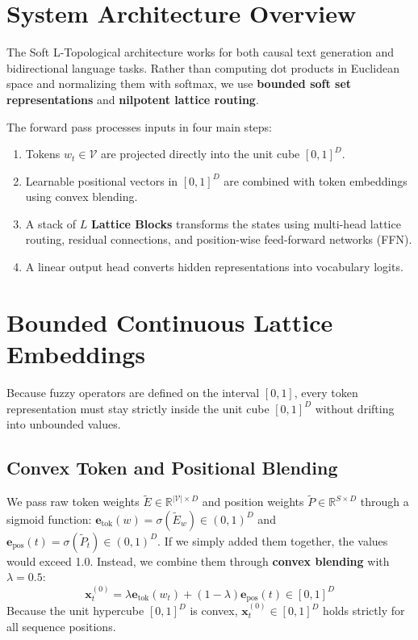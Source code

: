 \label{chap:methodology}

\section{System Architecture Overview}
The Soft L-Topological architecture works for both causal text generation and bidirectional language tasks. Rather than computing dot products in Euclidean space and normalizing them with softmax, we use \textbf{bounded soft set representations} and \textbf{nilpotent lattice routing}.

The forward pass processes inputs in four main steps:
\begin{enumerate}[itemsep=1.5pt, topsep=2pt, parsep=0pt]
    \item Tokens $w_t \in \mathcal{V}$ are projected directly into the unit cube $[0, 1]^D$.
    \item Learnable positional vectors in $[0, 1]^D$ are combined with token embeddings using convex blending.
    \item A stack of $L$ \textbf{Lattice Blocks} transforms the states using multi-head lattice routing, residual connections, and position-wise feed-forward networks (FFN).
    \item A linear output head converts hidden representations into vocabulary logits.
\end{enumerate}

\section{Bounded Continuous Lattice Embeddings}
Because fuzzy operators are defined on the interval $[0, 1]$, every token representation must stay strictly inside the unit cube $[0, 1]^D$ without drifting into unbounded values.

\subsection{Convex Token and Positional Blending}
We pass raw token weights $\widetilde{E} \in \mathbb{R}^{|\mathcal{V}| \times D}$ and position weights $\widetilde{P} \in \mathbb{R}^{S \times D}$ through a sigmoid function: $\mathbf{e}_{\text{tok}}(w) = \sigma(\widetilde{E}_w) \in (0, 1)^D$ and $\mathbf{e}_{\text{pos}}(t) = \sigma(\widetilde{P}_t) \in (0, 1)^D$. If we simply added them together, the values would exceed 1.0. Instead, we combine them through \textbf{convex blending} with $\lambda = 0.5$:
\begin{equation}
\label{eq:convex_blending}
\mathbf{x}_t^{(0)} = \lambda \mathbf{e}_{\text{tok}}(w_t) + (1 - \lambda) \mathbf{e}_{\text{pos}}(t) \in [0, 1]^D
\end{equation}
Because the unit hypercube $[0, 1]^D$ is convex, $\mathbf{x}_t^{(0)} \in [0, 1]^D$ holds strictly for all sequence positions.

